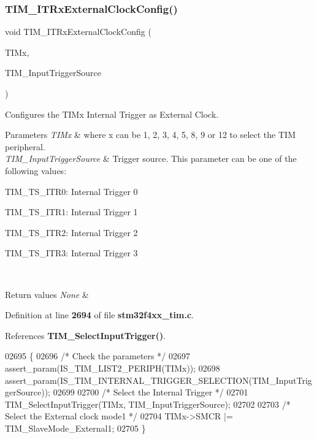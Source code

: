 \subsubsection{T\+I\+M\+\_\+\+I\+T\+Rx\+External\+Clock\+Config()}
{\footnotesize\ttfamily void T\+I\+M\+\_\+\+I\+T\+Rx\+External\+Clock\+Config (\begin{DoxyParamCaption}\item[{\textbf{ T\+I\+M\+\_\+\+Type\+Def} $\ast$}]{T\+I\+Mx,  }\item[{uint16\+\_\+t}]{T\+I\+M\+\_\+\+Input\+Trigger\+Source }\end{DoxyParamCaption})}



Configures the T\+I\+Mx Internal Trigger as External Clock. 


\begin{DoxyParams}{Parameters}
{\em T\+I\+Mx} & where x can be 1, 2, 3, 4, 5, 8, 9 or 12 to select the T\+IM peripheral. \\
\hline
{\em T\+I\+M\+\_\+\+Input\+Trigger\+Source} & Trigger source. This parameter can be one of the following values\+: \begin{DoxyItemize}
\item T\+I\+M\+\_\+\+T\+S\+\_\+\+I\+T\+R0\+: Internal Trigger 0 \item T\+I\+M\+\_\+\+T\+S\+\_\+\+I\+T\+R1\+: Internal Trigger 1 \item T\+I\+M\+\_\+\+T\+S\+\_\+\+I\+T\+R2\+: Internal Trigger 2 \item T\+I\+M\+\_\+\+T\+S\+\_\+\+I\+T\+R3\+: Internal Trigger 3 \end{DoxyItemize}
\\
\hline
\end{DoxyParams}

\begin{DoxyRetVals}{Return values}
{\em None} & \\
\hline
\end{DoxyRetVals}


Definition at line \textbf{ 2694} of file \textbf{ stm32f4xx\+\_\+tim.\+c}.



References \textbf{ T\+I\+M\+\_\+\+Select\+Input\+Trigger()}.


\begin{DoxyCode}
02695 \{
02696   \textcolor{comment}{/* Check the parameters */}
02697   assert_param(IS_TIM_LIST2_PERIPH(TIMx));
02698   assert_param(IS_TIM_INTERNAL_TRIGGER_SELECTION(TIM\_InputTriggerSource));
02699 
02700   \textcolor{comment}{/* Select the Internal Trigger */}
02701   TIM_SelectInputTrigger(TIMx, TIM\_InputTriggerSource);
02702 
02703   \textcolor{comment}{/* Select the External clock mode1 */}
02704   TIMx->SMCR |= TIM_SlaveMode_External1;
02705 \}
\end{DoxyCode}
\mbox{\label{group__TIM__Group6_gaf460e7d9c9969044e364130e209937fc}} 
